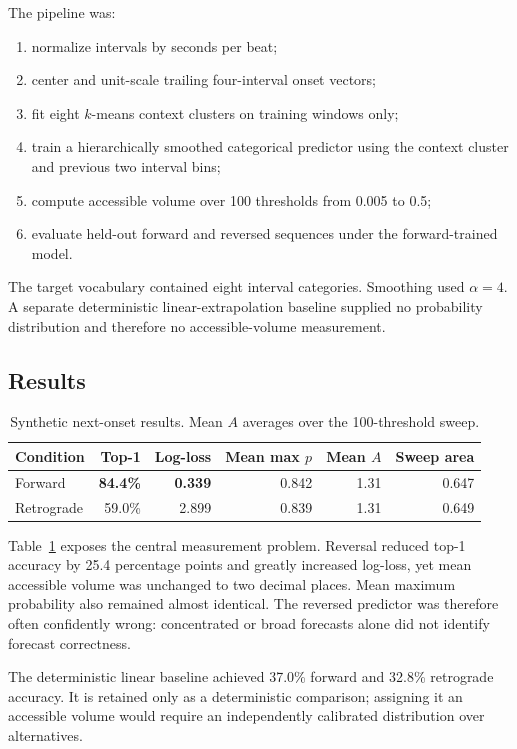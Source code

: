 \documentclass[11pt,a4paper]{article}
\begin{document}
The pipeline was:
\begin{enumerate}[nosep]
  \item normalize intervals by seconds per beat;
  \item center and unit-scale trailing four-interval onset vectors;
  \item fit eight $k$-means context clusters on training windows only;
  \item train a hierarchically smoothed categorical predictor using the context cluster and previous two interval bins;
  \item compute accessible volume over 100 thresholds from 0.005 to 0.5;
  \item evaluate held-out forward and reversed sequences under the forward-trained model.
\end{enumerate}
The target vocabulary contained eight interval categories. Smoothing used $\alpha=4$. A separate deterministic linear-extrapolation baseline supplied no probability distribution and therefore no accessible-volume measurement.

\subsection{Results}
\begin{table}[htbp]
\centering
\caption{Synthetic next-onset results. Mean $A$ averages over the 100-threshold sweep.}
\label{tab:synthetic}
\begin{tabular}{lrrrrr}
\toprule
Condition & Top-1 & Log-loss & Mean max $p$ & Mean $A$ & Sweep area \\
\midrule
Forward & \textbf{84.4\%} & \textbf{0.339} & 0.842 & 1.31 & 0.647 \\
Retrograde & 59.0\% & 2.899 & 0.839 & 1.31 & 0.649 \\
\bottomrule
\end{tabular}
\end{table}

Table~\ref{tab:synthetic} exposes the central measurement problem. Reversal reduced top-1 accuracy by 25.4 percentage points and greatly increased log-loss, yet mean accessible volume was unchanged to two decimal places. Mean maximum probability also remained almost identical. The reversed predictor was therefore often confidently wrong: concentrated or broad forecasts alone did not identify forecast correctness.

The deterministic linear baseline achieved 37.0\% forward and 32.8\% retrograde accuracy. It is retained only as a deterministic comparison; assigning it an accessible volume would require an independently calibrated distribution over alternatives.
\end{document}
